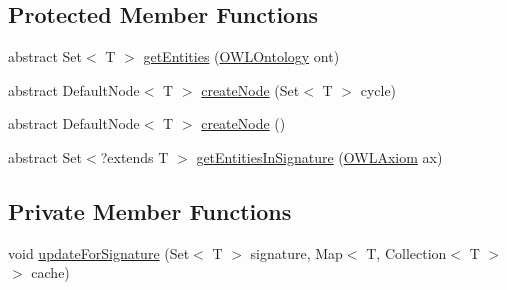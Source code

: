 \subsection*{Protected Member Functions}
\begin{DoxyCompactItemize}
\item 
abstract Set$<$ T $>$ \hyperlink{classorg_1_1semanticweb_1_1owlapi_1_1reasoner_1_1structural_1_1_structural_reasoner_1_1_hierarch7d8ade138c58c437609a51314b153fe1_a07bc07b120040db08b586709c06d83eb}{get\-Entities} (\hyperlink{interfaceorg_1_1semanticweb_1_1owlapi_1_1model_1_1_o_w_l_ontology}{O\-W\-L\-Ontology} ont)
\item 
abstract Default\-Node$<$ T $>$ \hyperlink{classorg_1_1semanticweb_1_1owlapi_1_1reasoner_1_1structural_1_1_structural_reasoner_1_1_hierarch7d8ade138c58c437609a51314b153fe1_ad26a5bc1ade7764410c7ed2f1f92ae03}{create\-Node} (Set$<$ T $>$ cycle)
\item 
abstract Default\-Node$<$ T $>$ \hyperlink{classorg_1_1semanticweb_1_1owlapi_1_1reasoner_1_1structural_1_1_structural_reasoner_1_1_hierarch7d8ade138c58c437609a51314b153fe1_a5c902e63e4cc2f328573333342c14dc6}{create\-Node} ()
\item 
abstract Set$<$?extends T $>$ \hyperlink{classorg_1_1semanticweb_1_1owlapi_1_1reasoner_1_1structural_1_1_structural_reasoner_1_1_hierarch7d8ade138c58c437609a51314b153fe1_a253da46eb32664de4c4d9f083ab3d6db}{get\-Entities\-In\-Signature} (\hyperlink{interfaceorg_1_1semanticweb_1_1owlapi_1_1model_1_1_o_w_l_axiom}{O\-W\-L\-Axiom} ax)
\end{DoxyCompactItemize}
\subsection*{Private Member Functions}
\begin{DoxyCompactItemize}
\item 
void \hyperlink{classorg_1_1semanticweb_1_1owlapi_1_1reasoner_1_1structural_1_1_structural_reasoner_1_1_hierarch7d8ade138c58c437609a51314b153fe1_ab804fa9f36af7505c2d16e761f2d5519}{update\-For\-Signature} (Set$<$ T $>$ signature, Map$<$ T, Collection$<$ T $>$$>$ cache)
\end{DoxyCompactItemize}

